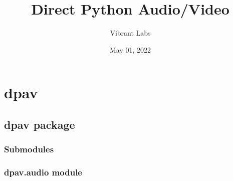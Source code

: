 \documentclass[letterpaper,10pt,english]{sphinxmanual}
\title{Direct Python Audio/Video}
\date{May 01, 2022}
\author{Vibrant Labs}
\begin{document}
\pagestyle{empty}
\sphinxmaketitle
\pagestyle{plain}
\sphinxtableofcontents
\pagestyle{normal}
\label{\detokenize{index::doc}}


\sphinxstepscope


\chapter{dpav}
\label{\detokenize{modules:dpav}}\label{\detokenize{modules::doc}}
\sphinxstepscope


\section{dpav package}
\label{\detokenize{dpav:dpav-package}}\label{\detokenize{dpav::doc}}

\subsection{Submodules}
\label{\detokenize{dpav:submodules}}

\subsection{dpav.audio module}
\label{\detokenize{dpav:module-dpav.audio}}\label{\detokenize{dpav:dpav-audio-module}}
\end{document}
